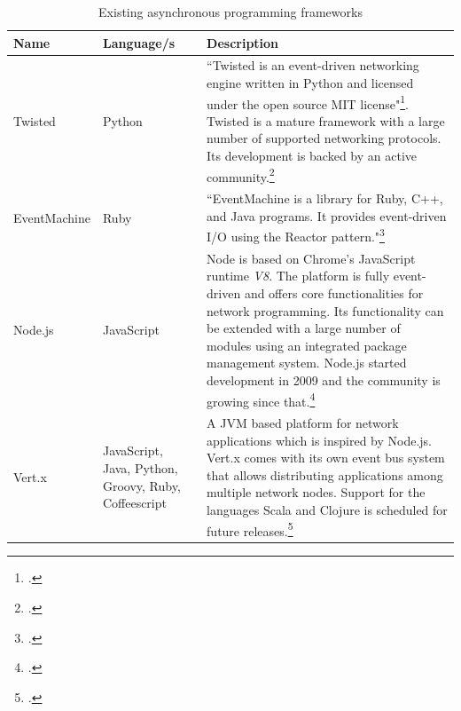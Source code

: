 \FloatBarrier
\newpage
\begin{savenotes} %
\begin{table}
\begin{tabular*}{\textwidth}{p{} p{} p{}}
\toprule
\textbf{Name} & \textbf{Language/s} & \textbf{Description} \\
\midrule 
Twisted			& Python			& ``Twisted is an event-driven networking engine written in 
									  Python and licensed under the open source MIT license"\footcite[Cf.][]{Twisted_2012}.
									  Twisted is a mature framework with a large number of supported networking
									  protocols. Its development is backed by an active
									  community.\footcite[Cf.][12]{fettig_2005}
									  \\
									  
EventMachine 	& Ruby    			& ``EventMachine is a library for Ruby, C++, and Java
									  programs. It provides event-driven I/O using the Reactor 
									  pattern."\footcite[][]{eventmachine_2012}\\

Node.js			& JavaScript		& Node is based on Chrome's JavaScript runtime \textit{V8}.
									  The platform is fully event-driven and offers core
									  functionalities for network programming. Its functionality
									  can be extended with a large number of modules using an
									  integrated package management system.
									  Node.js started development in 2009 and the community
									  is growing since that.\footcite[Cf.][]{Mashtable_2011}\\
									  
Vert.x			& JavaScript, Java, Python, Groovy, Ruby, Coffeescript		
									& A JVM based platform for network applications which is
									  inspired by Node.js. Vert.x comes with its own event
									  bus system that allows distributing applications
									  among multiple network nodes. Support for the languages
									  Scala and Clojure is scheduled for future releases.\footcite[Cf.][]{vertx_2012}\\
\bottomrule 
\end{tabular*}
  \caption{Existing asynchronous programming frameworks}
  \label{tab:existing_frameworks}
\end{table}
\end{savenotes}


